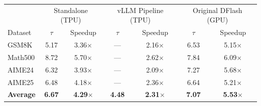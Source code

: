 \centering
\begin{tabular}{l|cc|cc|cc}
\toprule
 & \multicolumn{2}{c|}{Standalone (TPU)} & \multicolumn{2}{c|}{vLLM Pipeline (TPU)} & \multicolumn{2}{c}{Original DFlash (GPU)} \\
Dataset & $\tau$ & Speedup & $\tau$ & Speedup & $\tau$ & Speedup \\
\midrule
GSM8K   & 5.17 & 3.36$\times$ & --- & 2.16$\times$ & 6.53 & 5.15$\times$ \\
Math500 & 8.72 & 5.70$\times$ & --- & 2.62$\times$ & 7.84 & 6.09$\times$ \\
AIME24  & 6.32 & 3.93$\times$ & --- & 2.09$\times$ & 7.27 & 5.68$\times$ \\
AIME25  & 6.48 & 4.18$\times$ & --- & 2.36$\times$ & 6.64 & 5.21$\times$ \\
\midrule
\textbf{Average} & \textbf{6.67} & \textbf{4.29}$\times$ & \textbf{4.48} & \textbf{2.31}$\times$ & \textbf{7.07} & \textbf{5.53}$\times$ \\
\bottomrule
\end{tabular}
